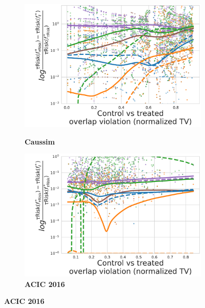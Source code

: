 \documentclass[unnumsec,webpdf,contemporary,large]{oup-authoring-template}%
\theoremstyle{thmstyleone}%
\theoremstyle{thmstyletwo}%
\theoremstyle{thmstylethree}%
\begin{document}
\begin{appendices}
    \begin{figure}
        \centering
        \begin{subfigure}[b]{0.44\textwidth}
            \centering
            \caption{\textbf{Caussim}}
            \includegraphics[width=\textwidth]{normalized_bias_tau_risk_to_best_method_caussim__nuisance_non_linear__candidates_ridge__overlap_01-247.pdf}
            \label{fig:normalized_bias_tau_risk_to_best_method_caussim}
        \end{subfigure}
        \hfill
        \begin{subfigure}[b]{0.44\textwidth}
            \centering
            \caption{\textbf{ACIC 2016}}
            \includegraphics[width=\textwidth]{normalized_bias_tau_risk_to_best_method_acic_2016__nuisance_non_linear__candidates_hist_gradient_boosting__dgp_1-77__rs_1-10.pdf}

\end{subfigure}
\end{figure}
\end{appendices}
\end{document}
